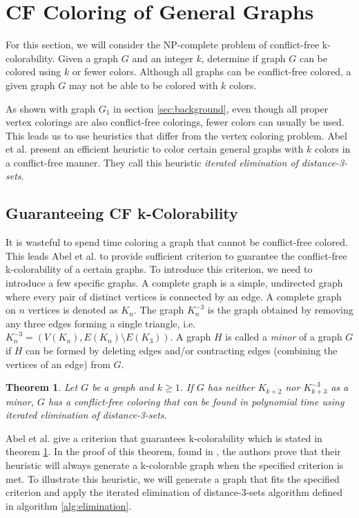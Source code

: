 \documentclass{sig-alternate}
\newtheorem{theorem}{Theorem}
\begin{document}
\section{CF Coloring of General Graphs}
\label{sec:general-coloring}
For this section, we will consider the NP-complete problem of conflict-free k-colorability. Given a graph $G$ and an integer $k$, determine if graph $G$ can be colored using $k$ or fewer colors. Although all graphs can be conflict-free colored, a given graph $G$ may not be able to be colored with $k$ colors.

As shown with graph $G_1$ in section \ref{sec:background}, even though all proper vertex colorings are also conflict-free colorings, fewer colors can usually be used. This leads us to use heuristics that differ from the vertex coloring problem. Abel et al. \cite{abel2017three} present an efficient heuristic to color certain general graphs with $k$ colors in a conflict-free manner. They call this heuristic \emph{iterated elimination of distance-3-sets}.

\subsection{Guaranteeing CF k-Colorability}
It is wasteful to spend time coloring a graph that cannot be conflict-free colored. This leads Abel et al. to provide sufficient criterion to guarantee the conflict-free k-colorability of a certain graphs. To introduce this criterion, we need to introduce a few specific graphs. A complete graph is a simple, undirected graph where every pair of distinct vertices is connected by an edge. A complete graph on $n$ vertices is denoted as $K_n$. The graph $K_n^{-3}$ is the graph obtained by removing any three edges forming a single triangle, i.e. \(K_n^{-3} =  \left ( V(K_n), E(K_n) \setminus E(K_3) \right ) \). A graph $H$ is called a \emph{minor} of a graph $G$ if $H$ can be formed by deleting edges and/or contracting edges (combining the vertices of an edge) from $G$. \cite{abel2017three,bondy1976graph}

\begin{theorem} \label{thm:criterion}
Let $G$ be a graph and $k \geq 1$. If $G$ has neither $K_{k+2}$ nor $K_{k+3}^{-3}$ as a minor, $G$ has a conflict-free coloring that can be found in polynomial time using iterated elimination of distance-3-sets.
\end{theorem}

Abel et al. give a criterion that guarantees k-colorability which is stated in theorem \ref{thm:criterion}. In the proof of this theorem, found in \cite{abel2017three}, the authors prove that their heuristic will always generate a k-colorable graph when the specified criterion is met. To illustrate this heuristic, we will generate a graph that fits the specified criterion and apply the iterated elimination of distance-3-sets algorithm defined in algorithm \ref{alg:elimination}.
\end{document}
